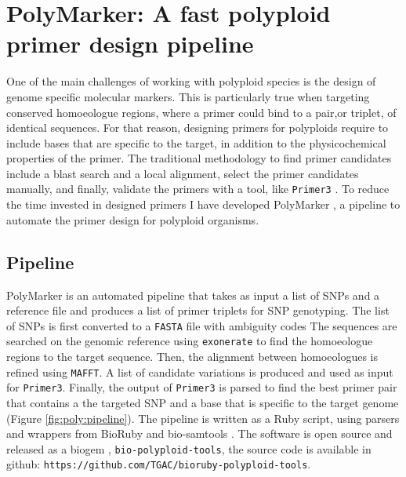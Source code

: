 
\chapter{PolyMarker: A fast polyploid primer design pipeline}
One of the main challenges of working with polyploid species is the design of genome specific molecular markers. 
This is particularly true when targeting conserved homoeologue regions, where a primer could bind to a pair,or triplet, of identical sequences. 
For that reason, designing primers for polyploids require to include bases that are specific to the target, in addition to the physicochemical properties of the primer.  
The traditional methodology to find primer candidates include a blast search and a local alignment, select the primer candidates manually, and finally, validate the primers with a tool, like \texttt{Primer3} \citep{Rozen}. 
To reduce the time invested in designed primers I have developed PolyMarker \citep{Ramirez-Gonzalez2015a}, a pipeline to automate the primer design for polyploid organisms.  

\section{Pipeline}
PolyMarker is an automated pipeline that takes as input a list of SNPs and a reference file and produces a list of primer triplets for SNP genotyping. 
The list of SNPs is first converted to a \texttt{FASTA} file with ambiguity codes\citep{Cornish-Bowden1985} 
The sequences are searched on the genomic reference using \texttt{exonerate}\citep{Slater2005} to find the homoeologue regions to the target sequence. 
Then, the alignment between homoeologues is refined using \texttt{MAFFT}\citep{Katoh2013}. 
A list of candidate variations is produced and used as input for \texttt{Primer3}\citep{Rozen}. 
Finally, the output of \texttt{Primer3} is parsed to find the best primer pair that contains a the targeted SNP and a base that is specific to the target genome (Figure \ref{fig:poly:pipeline}).  
The pipeline is written as a Ruby script, using parsers and wrappers from BioRuby \citep{Goto2010} and bio-samtools \citep{Etherington2015,Ramirez-Gonzalez2012}. 
The software is open source and released as a biogem \citep{Bonnal2012}, \texttt{bio-polyploid-tools}, the source code is available in github: \texttt{https://github.com/TGAC/bioruby-polyploid-tools}.

